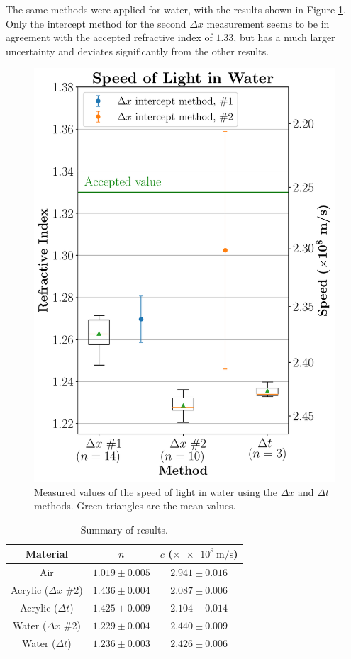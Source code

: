 \documentclass[
    aps,
    prl,
    reprint,
    10pt,
    amsmath,
    amssymb,
    a4paper,
    longbibliography
]{revtex4-2}
\begin{document}
The same methods were applied for water, with the results shown in Figure
\ref{water_plot}. Only the intercept method for the second $\Delta x$
measurement seems to be in agreement with the accepted refractive index
of $1.33$, but has a much larger uncertainty and deviates significantly
from the other results.

\begin{figure}[ht]
    \centering
    \includegraphics[width=0.7\linewidth]{water}
    \caption{Measured values of the speed of light in water using
        the $\Delta x$ and $\Delta t$ methods. Green triangles are
        the mean values.}
    \label{water_plot}
\end{figure}

\begin{table}[ht]
    \begin{tabular}{|c|c|c|}
        \hline
        \textbf{Material}
        & $n$
        & $c$ ($\times \SI{e8}{\meter \per\second}$) \\
        \hline
        \hline
        Air & $1.019 \pm 0.005$ & $2.941 \pm 0.016$ \\
        \hline
        Acrylic ($\Delta x$ \#2) & $1.436 \pm 0.004$ & $2.087 \pm 0.006$ \\
        \hline
        Acrylic ($\Delta t$) & $1.425 \pm 0.009$ & $2.104 \pm 0.014$ \\
        \hline
        Water ($\Delta x$ \#2) & $1.229 \pm 0.004$ & $2.440 \pm 0.009$ \\
        \hline
        Water ($\Delta t$) & $1.236 \pm 0.003$ & $2.426 \pm 0.006$ \\
        \hline
    \end{tabular}
    \caption{Summary of results.}
    \label{results_table}
\end{table}
\end{document}
